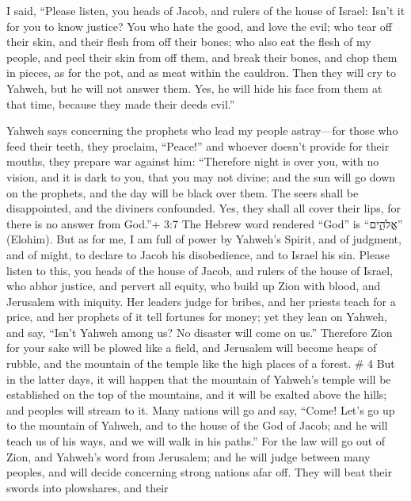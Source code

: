  I said, ``Please listen, you heads of Jacob, and rulers of
the house of Israel: Isn't it for you to know justice?  You
who hate the good, and love the evil; who tear off their skin, and their
flesh from off their bones;  who also eat the flesh of my
people, and peel their skin from off them, and break their bones, and
chop them in pieces, as for the pot, and as meat within the cauldron.
 Then they will cry to Yahweh, but he will not answer them.
Yes, he will hide his face from them at that time, because they made
their deeds evil.''

 Yahweh says concerning the prophets who lead my people
astray---for those who feed their teeth, they proclaim, ``Peace!'' and
whoever doesn't provide for their mouths, they prepare war against him:
 ``Therefore night is over you, with no vision, and it is
dark to you, that you may not divine; and the sun will go down on the
prophets, and the day will be black over them.  The seers
shall be disappointed, and the diviners confounded. Yes, they shall all
cover their lips, for there is no answer from God.''+ 3:7 The Hebrew
word rendered ``God'' is ``אֱלֹהִ֑ים'' (Elohim).  But as for
me, I am full of power by Yahweh's Spirit, and of judgment, and of
might, to declare to Jacob his disobedience, and to Israel his sin.
 Please listen to this, you heads of the house of Jacob, and
rulers of the house of Israel, who abhor justice, and pervert all
equity,  who build up Zion with blood, and Jerusalem with
iniquity.  Her leaders judge for bribes, and her priests
teach for a price, and her prophets of it tell fortunes for money; yet
they lean on Yahweh, and say, ``Isn't Yahweh among us? No disaster will
come on us.''  Therefore Zion for your sake will be plowed
like a field, and Jerusalem will become heaps of rubble, and the
mountain of the temple like the high places of a forest. \# 4
 But in the latter days, it will happen that the mountain of
Yahweh's temple will be established on the top of the mountains, and it
will be exalted above the hills; and peoples will stream to it.
 Many nations will go and say, ``Come! Let's go up to the
mountain of Yahweh, and to the house of the God of Jacob; and he will
teach us of his ways, and we will walk in his paths.'' For the law will
go out of Zion, and Yahweh's word from Jerusalem;  and he
will judge between many peoples, and will decide concerning strong
nations afar off. They will beat their swords into plowshares, and their
